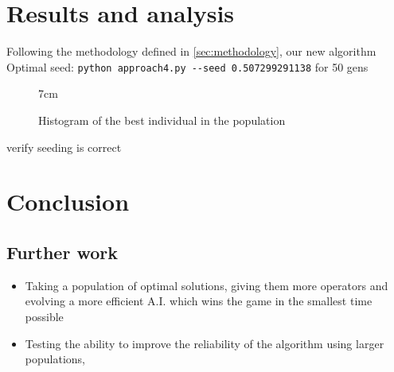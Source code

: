 \documentclass[british,10pt,a4paper]{article}
\begin{document}
\section{Results and analysis}
Following the methodology defined in \autoref{sec:methodology}, our new algorithm 
Optimal seed: \lstinline{python approach4.py --seed 0.507299291138} for 50 gens

\begin{figure}
\centering
\resizebox {!} {7cm} {
}
\caption{Histogram of the best individual in the population}
\label{fig:approach1_vs_approach4}
\end{figure}

\TODO verify seeding is correct
\section{Conclusion}

\subsection{Further work}
\begin{itemize}
	\item Taking a population of optimal solutions, giving them more operators and evolving a more efficient A.I. which wins the game in the smallest time possible
	\item Testing the ability to improve the reliability of the algorithm using larger populations, 
\end{itemize}

\clearpage
\end{document}
